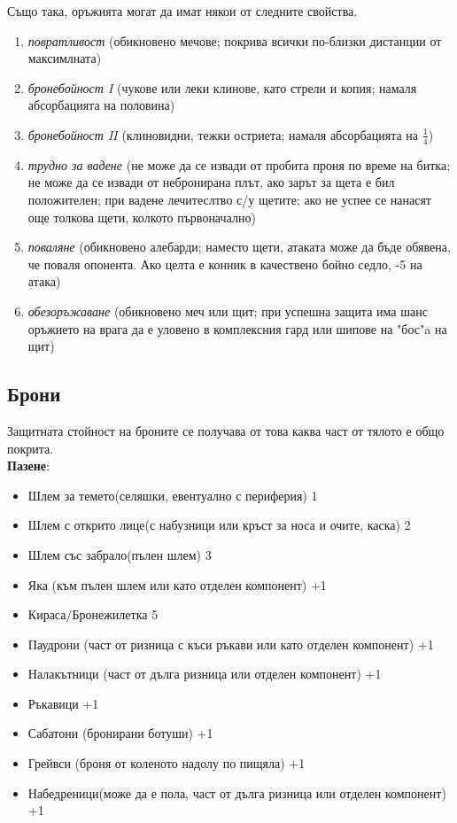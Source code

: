 Също така, оръжията могат да имат някои от следните свойства.
\begin{enumerate}
\item{\textit{повратливост} (обикновено мечове; покрива всички по-близки дистанции от максимлната)}
\item{\textit{бронебойност I} (чукове или леки клинове, като стрели и копия; намаля абсорбацията на половина)}
\item{\textit{бронебойност II} (клиновидни, тежки остриета; намаля абсорбацията на $\frac1 4$)}
\item{\textit{трудно за вадене} (не може да се извади от пробита проня по време на битка; не може да се извади от небронирана плът, ако зарът за щета е бил положителен; при вадене лечитеслтво с/у щетите; ако не успее се  нанасят още толкова щети, колкото първоначално)}
\item{\textit{поваляне} (обикновено алебарди; наместо щети, атаката може да бъде обявена, че поваля опонента. Ако целта е конник в качествено бойно седло, -5 на атака)}
\item{\textit{обезоръжаване} (обикновено меч или щит; при успешна защита има шанс оръжието на врага да е уловено в комплексния гард или шипове на "бос"a на щит)}
\end{enumerate}

\subsection{Брони}
Защитната стойност на броните се получава от това каква част от тялото е общо покрита.
\\[1cm]
\textbf{Пазене}:
\begin{itemize}[topsep=-0cm, partopsep=0cm, parsep=0cm, itemsep=0cm]
\item{Шлем за темето(селяшки, евентуално с периферия) 1}
\item{Шлем с открито лице(с набузници или кръст за носа и очите, каска) 2}
\item{Шлем със забрало(пълен шлем) 3}
\item{Яка (към пълен шлем или като отделен компонент) +1}

\item{Кираса/Бронежилетка 5}

\item{Паудрони (част от ризница с къси ръкави или като отделен компонент) +1}
\item{Налакътници (част от дълга ризница или отделен компонент) +1}
\item{Ръкавици +1}

\item{Сабатони (бронирани ботуши) +1}
\item{Грейвси (броня от коленото надолу по пищяла) +1}
\item{Набедреници(може да е пола, част от дълга ризница или отделен компонент) +1}
\end{itemize}

